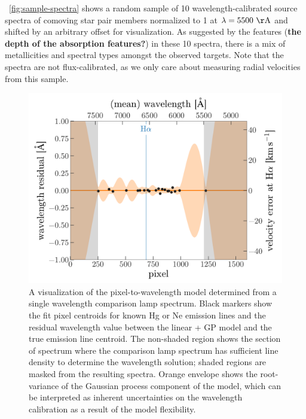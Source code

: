 \documentclass[modern, letterpaper]{aastex61}
\begin{document}
\figurename~\ref{fig:sample-spectra} shows a random sample of 10
wavelength-calibrated source spectra of comoving star pair members normalized
to 1 at $\lambda = 5500~{\rm \AA}$ and shifted by an arbitrary offset for
visualization.
As suggested by the features ({\bf the depth of the absorption features?}) in
these 10 spectra, there is a mix of metallicities and spectral types amongst
the observed targets.
Note that the spectra are not flux-calibrated, as we only care about measuring
radial velocities from this sample.

\begin{figure}[htbp]
  \begin{center}
    \includegraphics[width=0.8\linewidth]{wavelength_gp.pdf}
  \end{center}
  \caption{%
    A visualization of the pixel-to-wavelength model determined from a single
    wavelength comparison lamp spectrum.
    Black markers show the fit pixel centroids for known Hg or Ne emission
    lines and the residual wavelength value between the linear + GP model and
    the true emission line centroid.
    The non-shaded region shows the section of spectrum where the comparison
    lamp spectrum has sufficient line density to determine the wavelength
    solution; shaded regions are masked from the resulting spectra.
    Orange envelope shows the root-variance of the Gaussian process component
    of the model, which can be interpreted as inherent uncertainties on the
    wavelength calibration as a result of the model flexibility.
    \label{fig:wavelength-GP}}
\end{figure}
\end{document}
